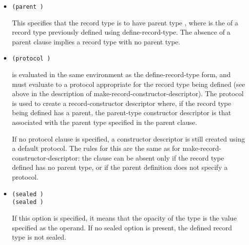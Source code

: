 \begin{entry}{%
}
\begin{itemize}
  {\cf \mbox{(immutable  )}}\\
  {\cf \mbox{(mutable   )}}

  , , and 
  must all be identifiers. The first form declares an immutable field
  called , with the corresponding accessor named . The second form declares a mutable field called ,
  with the corresponding accessor named , and with the
  corresponding mutator named .
   
  The s become, as symbols, the names of the fields of the
  record type being created, in the same order. They are not used in any
  other way.
   
\item {\tt (parent )}
   
  This specifies that the record type is to have parent type
  , where  is the  of a record type previously defined using {\cf
      define-record-type}. The absence of a parent clause implies a
    record type with no parent type.
   
\item {\tt (protocol )}
   
   is evaluated in the same environment as the
  define-record-type form, and must evaluate to a protocol appropriate
  for the record type being defined (see above in the description of
  {\cf make-record-constructor-descriptor}). The protocol is used to
  create a record-constructor descriptor where, if the record type
  being defined has a parent, the parent-type constructor descriptor
  is that associated with the parent type specified in the {\cf
    parent} clause.
   
  If no {\cf protocol} clause is specified, a constructor descriptor
  is still created using a default protocol. The rules for this are
  the same as for {\cf make-record-constructor-descriptor}: the clause
  can be absent only if the record type defined has no parent type, or
  if the parent definition does not specify a protocol.
   
\item {\tt (sealed \schtrue)}\\
  {\tt (sealed \schfalse)}
   
  If this option is specified, it means that the opacity of the type
  is the value specified as the operand. If no {\cf sealed} option is
  present, the defined record type is not sealed.
   

\end{itemize}
\end{entry}
